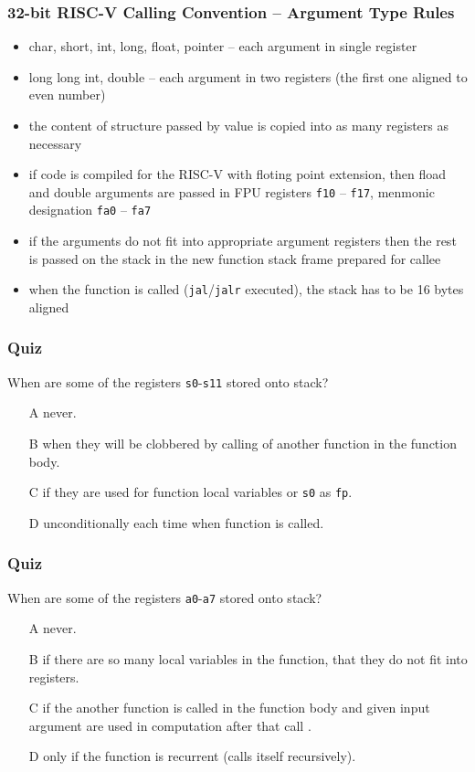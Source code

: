 \documentclass{beamer}
\begin{document}
\begin{frame}
\frametitle{32-bit RISC-V Calling Convention -- Argument Type Rules}

\begin{itemize}
 \item char, short, int, long, float, pointer -- each argument in single register
 \item long long int, double -- each argument in two registers (the first one aligned to even number)
 \item the content of structure passed by value is copied into as many registers as necessary
 \item if code is compiled for the RISC-V with floting point extension, then fload and double arguments are passed in FPU registers \texttt{f10} -- \texttt{f17}, menmonic designation \texttt{fa0} -- \texttt{fa7}
 \item if the arguments do not fit into appropriate argument registers then the rest is passed on the stack in the new function stack frame prepared for callee
 \item when the function is called (\texttt{jal}/\texttt{jalr} executed), the stack has to be 16 bytes aligned
\end{itemize}
\end{frame}


\begin{frame}
\frametitle{Quiz}

When are some of the registers \texttt{s0}-\texttt{s11} stored onto stack?
\begin{itemize}
 \item[A] never.
 \item[B] when they will be clobbered by calling of another function in the function body.
 \item[C] if they are used for function local variables or \texttt{s0} as \texttt{fp}.
 \item[D] unconditionally each time when function is called.
\end{itemize}
\end{frame}


\begin{frame}
\frametitle{Quiz}

When are some of the registers \texttt{a0}-\texttt{a7} stored onto stack?
\begin{itemize}
 \item[A] never.
 \item[B] if there are so many local variables in the function, that they do not fit into registers.
 \item[C] if the another function is called in the function body and given input argument are used in computation after that call .
 \item[D] only if the function is recurrent (calls itself recursively).
\end{itemize}
\end{frame}
\end{document}
